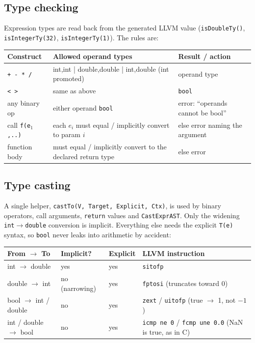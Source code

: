 \documentclass[10pt,a4paper]{article}
\newcommand{\code}[1]{\texttt{#1}}
\begin{document}
\subsection{Type checking}
Expression types are read back from the generated LLVM value
(\code{isDoubleTy()}, \code{isIntegerTy(32)}, \code{isIntegerTy(1)}). The rules are:

\begin{center}\small
\begin{tabular}{@{}lll@{}}
\toprule
Construct & Allowed operand types & Result / action \\
\midrule
\code{+ - * /} & int,int \; | \; double,double \; | \; int,double (int promoted) & operand type \\
\code{< >} & same as above & \code{bool} \\
any binary op & either operand \code{bool} & error: ``operands cannot be bool'' \\
call \code{f(e$_1$,..)} & each $e_i$ must equal / implicitly convert to param $i$ & else error naming the argument \\
function body & must equal / implicitly convert to the declared return type & else error \\
\bottomrule
\end{tabular}
\end{center}

\subsection{Type casting}
A single helper, \code{castTo(V, Target, Explicit, Ctx)}, is used by binary
operators, call arguments, \code{return} values and \code{CastExprAST}. Only the
widening \code{int}$\to$\code{double} conversion is implicit. Everything else
needs the explicit \code{T(e)} syntax, so \code{bool} never leaks into
arithmetic by accident:

\begin{center}\small
\begin{tabular}{@{}llll@{}}
\toprule
From $\to$ To & Implicit? & Explicit & LLVM instruction \\
\midrule
int $\to$ double & yes & yes & \code{sitofp} \\
double $\to$ int & no (narrowing) & yes & \code{fptosi} (truncates toward 0) \\
bool $\to$ int / double & no & yes & \code{zext} / \code{uitofp} (true $\to$ 1, not $-1$) \\
int / double $\to$ bool & no & yes & \code{icmp ne 0} / \code{fcmp une 0.0} (NaN is true, as in C) \\
\bottomrule
\end{tabular}
\end{center}
\end{document}
